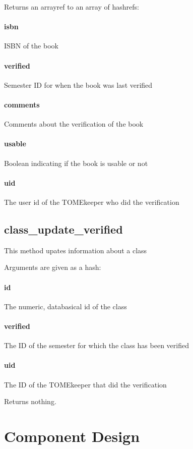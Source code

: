 \documentclass[12pt,titlepage]{article}
\begin{document}
Returns an arrayref to an array of hashrefs:
\paragraph{isbn}
ISBN of the book 

\paragraph{verified}
Semester ID for when the book was last verified 

\paragraph{comments}
Comments about the verification of the book 

\paragraph{usable}
Boolean indicating if the book is usable or not 

\paragraph{uid}
The user id of the TOMEkeeper who did the verification

\subsection{class\_update\_verified}
This method upates information about a class

Arguments are given as a hash:
\paragraph{id}
The numeric, databasical id of the class 

\paragraph{verified}
The ID of the semester for which the class has been verified 

\paragraph{uid}
The ID of the TOMEkeeper that did the verification 

Returns nothing.



\section{Component Design}
\end{document}
